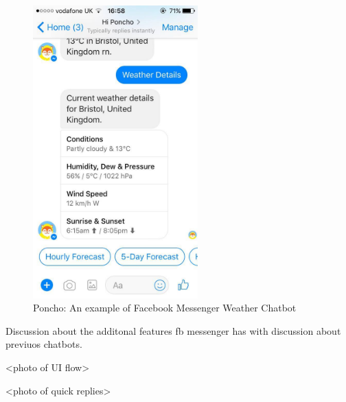 \begin{figure}[ht] %
    \centering
    \includegraphics[width=2.5in]{../resources/poncho.jpg}
    \caption{Poncho: An example of Facebook Messenger Weather Chatbot}
    \label{fig:poncho}
\end{figure}

Discussion about the additonal features fb messenger has with discussion about previuos chatbots.

<photo of UI flow>

<photo of quick replies>

